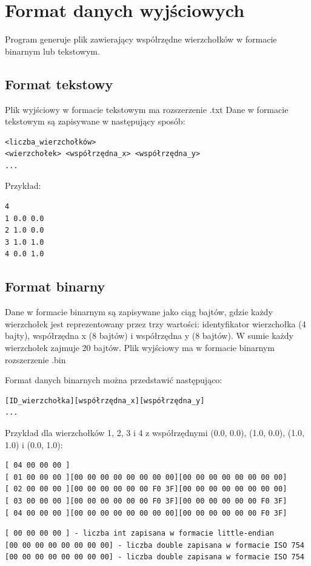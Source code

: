 \documentclass[12pt]{article}
\begin{document}
\section{Format danych wyjściowych}

Program generuje plik zawierający współrzędne wierzchołków w formacie binarnym
lub tekstowym.

\subsection{Format tekstowy}
Plik wyjściowy w formacie tekstowym ma rozszerzenie .txt
Dane w formacie tekstowym są zapisywane w następujący sposób:

\begin{verbatim}
<liczba_wierzchołków>
<wierzchołek> <współrzędna_x> <współrzędna_y>
...
\end{verbatim}

Przykład:

\begin{verbatim}
4
1 0.0 0.0
2 1.0 0.0
3 1.0 1.0
4 0.0 1.0
\end{verbatim}

\subsection{Format binarny}

Dane w formacie binarnym są zapisywane jako ciąg bajtów, gdzie każdy
wierzchołek jest reprezentowany przez trzy wartości: identyfikator wierzchołka
(4 bajty), współrzędna x (8 bajtów) i współrzędna y (8 bajtów). W sumie każdy
wierzchołek zajmuje 20 bajtów. Plik wyjściowy ma w formacie binarnym rozszerzenie .bin

Format danych binarnych można przedstawić następująco:

\begin{verbatim}
[ID_wierzchołka][współrzędna_x][współrzędna_y]
...
\end{verbatim}

Przykład dla wierzchołków 1, 2, 3 i 4 z współrzędnymi (0.0, 0.0), (1.0, 0.0), (1.0, 1.0) i (0.0, 1.0):
\begin{verbatim}
[ 04 00 00 00 ]
[ 01 00 00 00 ][00 00 00 00 00 00 00 00][00 00 00 00 00 00 00 00]
[ 02 00 00 00 ][00 00 00 00 00 00 F0 3F][00 00 00 00 00 00 00 00]
[ 03 00 00 00 ][00 00 00 00 00 00 F0 3F][00 00 00 00 00 00 F0 3F]
[ 04 00 00 00 ][00 00 00 00 00 00 00 00][00 00 00 00 00 00 F0 3F]
\end{verbatim}
{\small\begin{verbatim}
[ 00 00 00 00 ] - liczba int zapisana w formacie little-endian
[00 00 00 00 00 00 00 00] - liczba double zapisana w formacie ISO 754
[00 00 00 00 00 00 00 00] - liczba double zapisana w formacie ISO 754
\end{verbatim}}
\end{document}
